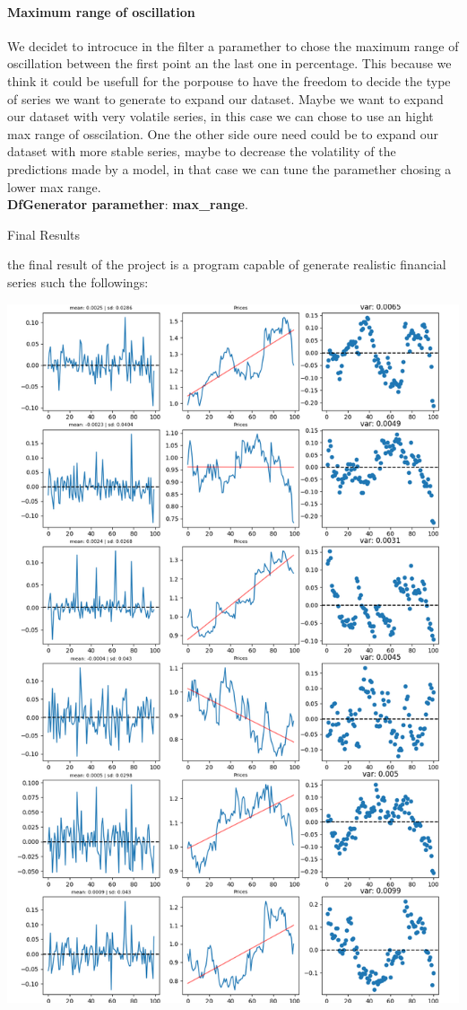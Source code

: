 \documentclass{article}
\begin{document}
\begin{multicols}{2}
    \paragraph*{Maximum range of oscillation}
    We decidet to introcuce in the filter a paramether to chose the maximum range of oscillation between the first point an the last one in percentage. This because we think it could be usefull for the porpouse to have the freedom to decide the type of series we want 
    to generate to expand our dataset. Maybe we want to expand our dataset with very volatile series, in this case we can chose to use an hight max range of osscilation. One the other side oure need could be to expand our dataset with more stable series, maybe to decrease 
    the volatility of the predictions made by a model, in that case we can tune the paramether chosing a lower max range.\\
    \textbf{DfGenerator paramether}:  \textbf{max\_range}.

    \end{multicols}
    \newpage
    \begin{center}
        {\huge{Final Results}}
    \end{center} 
    the final result of the project is a program capable of generate realistic financial series such the followings:
    \begin{center}
        \includegraphics[scale=0.5]{imgs/results_reduced.png}
    \end{center}
\end{document}
